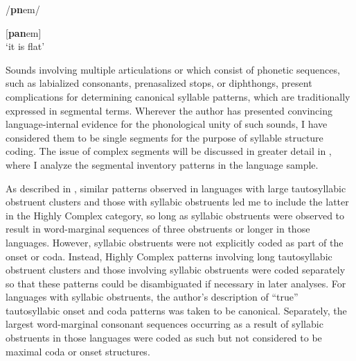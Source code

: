/\textbf{pn}em/

[\textbf{pan}em]\\
\glt ‘it is flat’
\citep[35-36]{Dol2007}
\z

  Sounds involving multiple articulations or which consist of phonetic sequences, such as labialized consonants, prenasalized stops, or diphthongs, present complications for determining canonical syllable patterns, which are traditionally expressed in segmental terms. Wherever the author has presented convincing language-internal evidence for the phonological unity of such sounds, I have considered them to be single segments for the purpose of syllable structure coding. The issue of complex segments will be discussed in greater detail in , where I analyze the segmental inventory patterns in the language sample.

  As described in , similar patterns observed in languages with large tautosyllabic obstruent clusters and those with syllabic obstruents led me to include the latter in the Highly Complex category, so long as syllabic obstruents were observed to result in word-marginal sequences of three obstruents or longer in those languages. However, syllabic obstruents were not explicitly coded as part of the onset or coda. Instead, Highly Complex patterns involving long tautosyllabic obstruent clusters and those involving syllabic obstruents were coded separately so that these patterns could be disambiguated if necessary in later analyses. For languages with syllabic obstruents, the author’s description of ``true'' tautosyllabic onset and coda patterns was taken to be canonical. Separately, the largest word-marginal consonant sequences occurring as a result of syllabic obstruents in those languages were coded as such but not considered to be maximal coda or onset structures.

